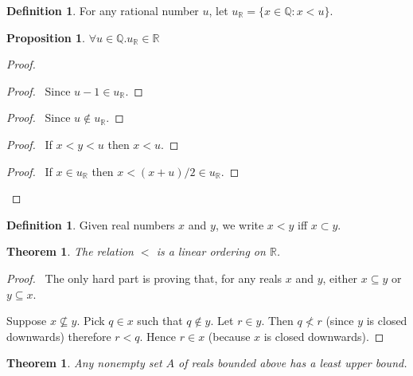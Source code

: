 \documentclass{article}
\let\qed\relax
\newtheorem{proposition}[axiom]{Proposition}
\newtheorem{theorem}[axiom]{Theorem}
\theoremstyle{definition}
\newtheorem{definition}[axiom]{Definition}
\begin{document}
    \begin{definition}
        For any rational number $u$, let $u_\mathbb{R} = \{ x \in \mathbb{Q} : x < u \}$.
    \end{definition}

    \begin{proposition}
        $\forall u \in \mathbb{Q}. u_\mathbb{R} \in \mathbb{R}$
    \end{proposition}

    \begin{proof}
        \pf
        \begin{proof}
            \pf\ Since $u-1 \in u_\mathbb{R}$.
        \end{proof}
        \begin{proof}
            \pf\ Since $u \notin u_\mathbb{R}$.
        \end{proof}
        \begin{proof}
            \pf\ If $x < y < u$ then $x < u$.
        \end{proof}
        \begin{proof}
            \pf\ If $x \in u_\mathbb{R}$ then $x < (x+u)/2 \in u_\mathbb{R}$.
        \end{proof}
        \qed
    \end{proof}
    \begin{definition}
        Given real numbers $x$ and $y$, we write $x < y$ iff $x \subset y$.
    \end{definition}

    \begin{theorem}
        The relation $<$ is a linear ordering on $\mathbb{R}$.
    \end{theorem}

    \begin{proof}
        \pf\ The only hard part is proving that, for any reals $x$ and $y$, either $x \subseteq y$ or
        $y \subseteq x$.

        Suppose $x \nsubseteq y$. Pick $q \in x$ such that $q \notin y$. Let $r \in y$. Then $q \nless r$
        (since $y$ is closed downwards) therefore $r < q$. Hence $r \in x$ (because $x$ is closed downwards).
        \qed
    \end{proof}

    \begin{theorem}
        Any nonempty set $A$ of reals bounded above has a least upper bound.
    \end{theorem}
\end{document}
